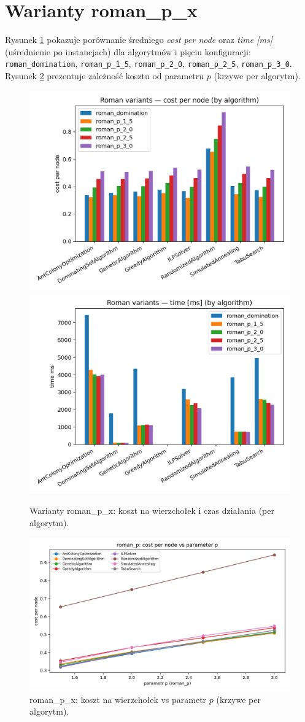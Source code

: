 \section{Warianty roman\_p\_x}

Rysunek \ref{fig:roman_group} pokazuje porównanie średniego \textit{cost per node} oraz \textit{time [ms]} (uśrednienie po instancjach) dla algorytmów i pięciu konfiguracji: \texttt{roman\_domination}, \texttt{roman\_p\_1\_5}, \texttt{roman\_p\_2\_0}, \texttt{roman\_p\_2\_5}, \texttt{roman\_p\_3\_0}. Rysunek \ref{fig:roman_curve} prezentuje zależność kosztu od parametru $p$ (krzywe per algorytm).

\begin{figure}[H]
  \centering
  \includegraphics[width=0.48\linewidth]{assets/figures/extensions/roman_variants_cost.png}
  \includegraphics[width=0.48\linewidth]{assets/figures/extensions/roman_variants_time.png}
\caption{Warianty roman\_p\_x: koszt na wierzchołek i czas działania (per algorytm).}
  \label{fig:roman_group}
\end{figure}

\begin{figure}[H]
  \centering
  \includegraphics[width=0.7\linewidth]{assets/figures/extensions/roman_p_curve_cost_per_node.png}
\caption{roman\_p\_x: koszt na wierzchołek vs parametr $p$ (krzywe per algorytm).}
  \label{fig:roman_curve}
\end{figure}

